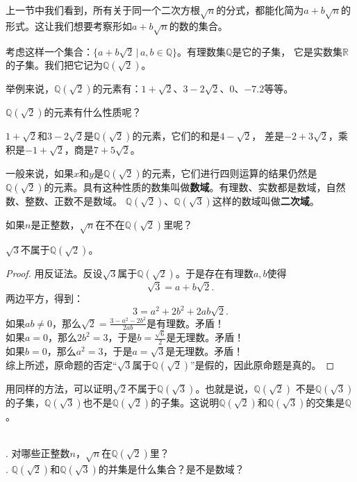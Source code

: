 \documentclass[12pt,UTF8,fontset=none]{ctexbook}
\begin{document}
上一节中我们看到，所有关于同一个二次方根$\sqrt{n}$的分式，都能化简为$a + b\sqrt{n}$的形式。这让我们想要考察形如$a + b\sqrt{n}$的数的集合。

考虑这样一个集合：$\{a + b\sqrt{2} \, | \, a, b \in\mathbb{Q}\}$。有理数集$\mathbb{Q}$是它的子集，
它是实数集$\mathbb{R}$的子集。我们把它记为$\mathbb{Q}(\sqrt{2})$。

举例来说，$\mathbb{Q}(\sqrt{2})$的元素有：$1 + \sqrt{2}$、$3 - 2\sqrt{2}$、$0$、$-7.2$等等。

$\mathbb{Q}(\sqrt{2})$的元素有什么性质呢？

$1 + \sqrt{2}$和$3 - 2\sqrt{2}$是$\mathbb{Q}(\sqrt{2})$的元素，它们的和是$4 - \sqrt{2}$，
差是$-2 + 3\sqrt{2}$，乘积是$-1 + \sqrt{2}$，商是$7 + 5\sqrt{2}$。

一般来说，如果$x$和$y$是$\mathbb{Q}(\sqrt{2})$的元素，它们进行四则运算的结果仍然是$\mathbb{Q}(\sqrt{2})$的元素。具有这种性质的数集叫做\textbf{数域}。有理数、实数都是数域，自然数、整数、正数不是数域。
$\mathbb{Q}(\sqrt{2})$、$\mathbb{Q}(\sqrt{3})$这样的数域叫做\textbf{二次域}。

如果$n$是正整数，$\sqrt{n}$在不在$\mathbb{Q}(\sqrt{2})$里呢？
\begin{tm}
    $\sqrt{3}$不属于$\mathbb{Q}(\sqrt{2})$。
\end{tm}\label{tm:3-1-0}
\begin{proof}
    用反证法。反设$\sqrt{3}$属于$\mathbb{Q}(\sqrt{2})$。于是存在有理数$a,b$使得
    $$ \sqrt{3} = a + b\sqrt{2}.$$
    两边平方，得到：
    $$ 3 = a^2 + 2b^2 + 2ab\sqrt{2}.$$
    如果$ab \neq 0$，那么$ \sqrt{2} = \frac{3 - a^2 - 2b^2}{2ab}$是有理数。矛盾！\\
    如果$a = 0$，那么$2b^2 = 3$，于是$b = \frac{\sqrt{6}}{2}$是无理数。矛盾！\\
    如果$b = 0$，那么$a^2 = 3$，于是$a = \sqrt{3}$是无理数。矛盾！\\
    综上所述，原命题的否定“$\sqrt{3}$属于$\mathbb{Q}(\sqrt{2})$”是假的，因此原命题是真的。
\end{proof}

用同样的方法，可以证明$\sqrt{2}$不属于$\mathbb{Q}(\sqrt{3})$。也就是说，$\mathbb{Q}(\sqrt{2})$
不是$\mathbb{Q}(\sqrt{3})$的子集，$\mathbb{Q}(\sqrt{3})$也不是$\mathbb{Q}(\sqrt{2})$的子集。这说明$\mathbb{Q}(\sqrt{2})$和$\mathbb{Q}(\sqrt{3})$的交集是$\mathbb{Q}$。

\begin{sk}\label{sk:3-2-0}
    \mbox{}\\
    . 对哪些正整数$n$，$\sqrt{n}$在$\mathbb{Q}(\sqrt{2})$里？\\
    . $\mathbb{Q}(\sqrt{2})$和$\mathbb{Q}(\sqrt{3})$的并集是什么集合？是不是数域？
\end{sk}
\end{document}
